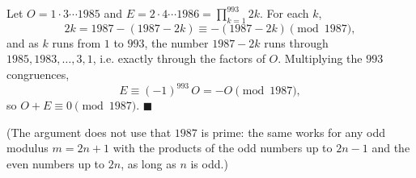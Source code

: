 Let $O=1\cdot3\cdots1985$ and $E=2\cdot4\cdots1986=\displaystyle\prod_{k=1}^{993}2k$. For each $k$,
\[2k=1987-(1987-2k)\equiv-(1987-2k)\pmod{1987},\]
and as $k$ runs from $1$ to $993$, the number $1987-2k$ runs through $1985,1983,\dots,3,1$, i.e. exactly through the factors of $O$. Multiplying the $993$ congruences,
\[E\equiv(-1)^{993}\,O=-O\pmod{1987},\]
so $O+E\equiv0\pmod{1987}$. $\blacksquare$

(The argument does not use that $1987$ is prime: the same works for any odd modulus $m=2n+1$ with the products of the odd numbers up to $2n-1$ and the even numbers up to $2n$, as long as $n$ is odd.)
